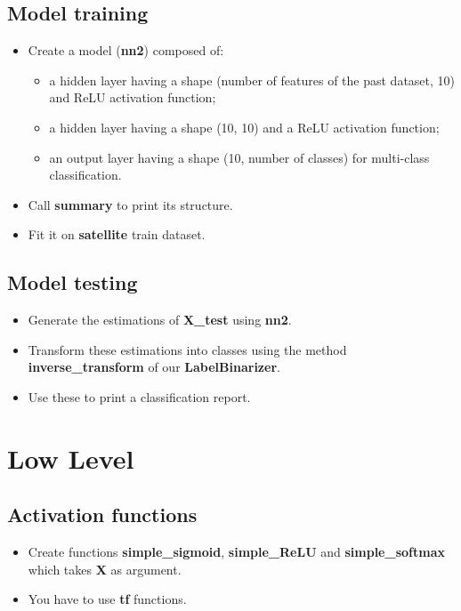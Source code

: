 \documentclass[11pt, a4paper]{article}
\begin{document}
\begin{multicols}{2}
	\subsection{Model training} 
	
	\begin{itemize}  
		\item Create a model (\textbf{nn2}) composed of:
		\begin{itemize} 
			\item a hidden layer having a shape (number of features of the past dataset, 10) and ReLU activation function;
			\item a hidden layer having a shape (10, 10) and a ReLU activation function;
			\item an output layer having a shape (10, number of classes) for multi-class classification.
		\end{itemize}
		\item Call \textbf{summary} to print its structure.
		\item Fit it on \textbf{satellite} train dataset.
	\end{itemize}
	
	\subsection{Model testing} 
	
	\begin{itemize}  
		\item Generate the estimations of \textbf{X\_test} using \textbf{nn2}.
		\item Transform these estimations into classes using the method \textbf{inverse\_transform} of our \textbf{LabelBinarizer}.
		\item Use these to print a classification report.
	\end{itemize}
	
	\section{Low Level}
	
	\subsection{Activation functions}
	
	\begin{itemize}  
		\item Create functions \textbf{simple\_sigmoid}, \textbf{simple\_ReLU} and \textbf{simple\_softmax} which takes \textbf{X} as argument.
		\item You have to use \textbf{tf} functions.
	\end{itemize}
	

\end{multicols}
\end{document}

